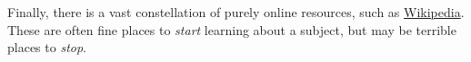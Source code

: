 Finally, there is a vast constellation of purely online resources, such as \href{https://en.wikipedia.org/wiki/Statistical_physics}{Wikipedia}.
These are often fine places to \emph{start} learning about a subject, but may be terrible places to \emph{stop}.
